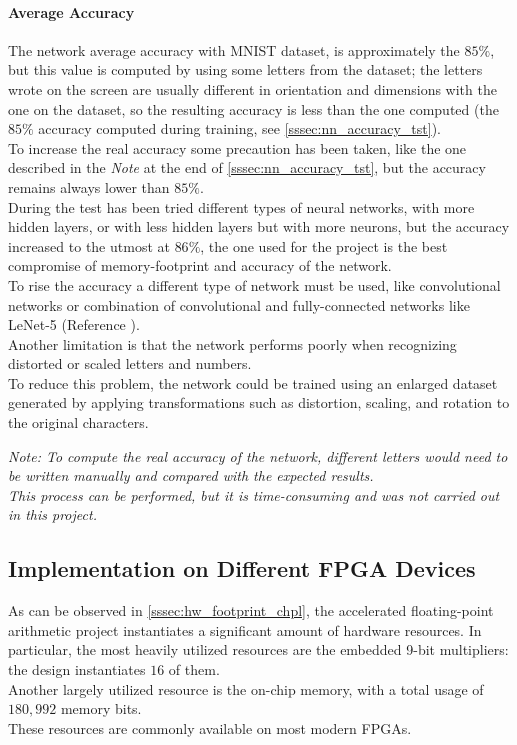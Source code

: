 \paragraph{Average Accuracy}

The network average accuracy with MNIST dataset, is approximately the \(85\%\), but this value is computed by using some letters from the dataset; the letters wrote on the screen are usually different in orientation and dimensions with the one on the dataset, so the resulting accuracy is less than the one computed (the \(85\%\) accuracy computed during training, see \autoref{sssec:nn_accuracy_tst}). \\
To increase the real accuracy some precaution has been taken, like the one described in the \textit{Note} at the end of \autoref{sssec:nn_accuracy_tst}, but the accuracy remains always lower than \(85\%\). \\
During the test has been tried different types of neural networks, with more hidden layers, or with less hidden layers but with more neurons, but the accuracy increased to the utmost at \(86\%\), the one used for the project is the best compromise of memory-footprint and accuracy of the network. \\
To rise the accuracy a different type of network must be used, like convolutional networks or combination of convolutional and fully-connected networks like LeNet-5 (Reference \cite{lecun1998}). \\
Another limitation is that the network performs poorly when recognizing distorted or scaled letters and numbers. \\
To reduce this problem, the network could be trained using an enlarged dataset generated by applying transformations such as distortion, scaling, and rotation to the original characters.

\vspace{3em}
\noindent
\textit{Note: To compute the real accuracy of the network, different letters would need to be written manually and compared with the expected results. \\
This process can be performed, but it is time-consuming and was not carried out in this project.}

\subsection{Implementation on Different FPGA Devices}

As can be observed in \autoref{sssec:hw_footprint_chpl}, the accelerated floating-point arithmetic project instantiates a significant amount of hardware resources. In particular, the most heavily utilized resources are the embedded 9-bit multipliers: the design instantiates \(16\) of them. \\
Another largely utilized resource is the on-chip memory, with a total usage of \(180,992\) memory bits. \\
These resources are commonly available on most modern FPGAs.

